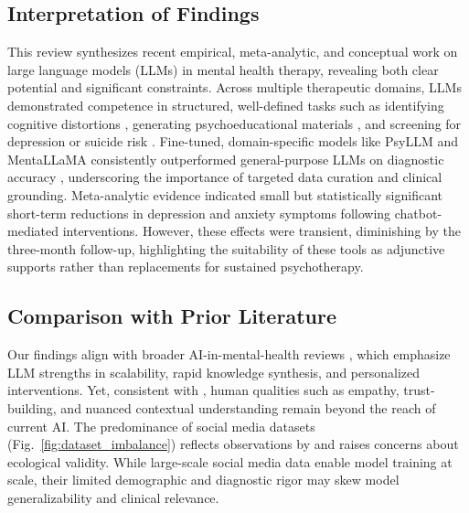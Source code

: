 \documentclass[journal]{IEEEtran}
\begin{document}
\subsection{Interpretation of Findings}
This review synthesizes recent empirical, meta-analytic, and conceptual work on large language models (LLMs) in mental health therapy, revealing both clear potential and significant constraints. Across multiple therapeutic domains, LLMs demonstrated competence in structured, well-defined tasks such as identifying cognitive distortions \citep{Hodson2024}, generating psychoeducational materials \citep{Kumar2023, Smith2023}, and screening for depression or suicide risk \citep{Yang2024}. Fine-tuned, domain-specific models like PsyLLM and MentaLLaMA consistently outperformed general-purpose LLMs on diagnostic accuracy \citep{Hu2025, Yang2024}, underscoring the importance of targeted data curation and clinical grounding.
Meta-analytic evidence \citep{Zhong2024} indicated small but statistically significant short-term reductions in depression and anxiety symptoms following chatbot-mediated interventions. However, these effects were transient, diminishing by the three-month follow-up, highlighting the suitability of these tools as adjunctive supports rather than replacements for sustained psychotherapy.

\subsection{Comparison with Prior Literature}
Our findings align with broader AI-in-mental-health reviews \citep{JMIR2024, Ibrahimov2024}, which emphasize LLM strengths in scalability, rapid knowledge synthesis, and personalized interventions. Yet, consistent with \citep{Minerva2023}, human qualities such as empathy, trust-building, and nuanced contextual understanding remain beyond the reach of current AI.
The predominance of social media datasets (Fig.~\ref{fig:dataset_imbalance}) reflects observations by \citep{Hua2024b} and raises concerns about ecological validity. While large-scale social media data enable model training at scale, their limited demographic and diagnostic rigor may skew model generalizability and clinical relevance.
\end{document}
